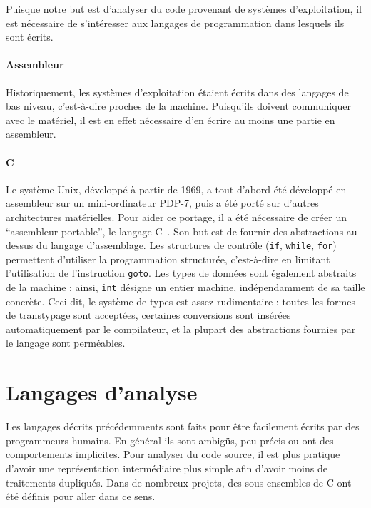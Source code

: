 Puisque notre but est d'analyser du code provenant de systèmes d'exploitation,
il est nécessaire de s'intéresser aux langages de programmation dans lesquels
ils sont écrits.

\paragraph{Assembleur}

Historiquement, les systèmes d'exploitation étaient écrits dans des langages de
bas niveau, c'est-à-dire proches de la machine. Puisqu'ils doivent communiquer
avec le matériel, il est en effet nécessaire d'en écrire au moins une partie en
assembleur.


\paragraph{C}

Le système Unix, développé à partir de 1969, a tout d'abord été développé en
assembleur sur un mini-ordinateur PDP-7, puis a été porté sur d'autres
architectures matérielles. Pour aider ce portage, il a été nécessaire de créer
un ``assembleur portable'', le langage C~\cite{KandR,AnsiC}. Son but est de
fournir des abstractions au dessus du langage d'assemblage. Les structures de
contrôle (\texttt{if}, \texttt{while}, \texttt{for}) permettent d'utiliser la
programmation structurée, c'est-à-dire en limitant l'utilisation de
l'instruction \texttt{goto}. Les types de données sont également abstraits de la
machine : ainsi, \texttt{int} désigne un entier machine, indépendamment de sa
taille concrète. Ceci dit, le système de types est assez rudimentaire : toutes
les formes de transtypage sont acceptées, certaines conversions sont insérées
automatiquement par le compilateur, et la plupart des abstractions fournies par
le langage sont perméables.



\section{Langages d'analyse}

Les langages décrits précédemments sont faits pour être facilement écrits par
des programmeurs humains. En général ils sont ambigüs, peu précis ou ont des
comportements implicites. Pour analyser du code source, il est plus pratique
d'avoir une représentation intermédiaire plus simple afin d'avoir moins de
traitements dupliqués. Dans de nombreux projets, des sous-ensembles de C ont été
définis pour aller dans ce sens.


